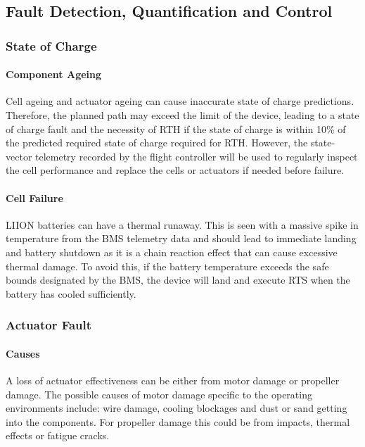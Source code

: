 \subsection{Fault Detection, Quantification and Control}\label{sub_section:tgt_fault_detection}

\subsubsection{State of Charge}\label{sub_sub_section:tgt_SOC}
\paragraph{Component Ageing}
Cell ageing and actuator ageing can cause inaccurate state of charge predictions. Therefore, the planned path may exceed the limit of the device, leading to a state of charge fault and the necessity of \gls{RTH} if the state of charge is within 10\% of the predicted required state of charge required for \gls{RTH}. However, the state-vector telemetry recorded by the flight controller will be used to regularly inspect the cell performance and replace the cells or actuators if needed before failure.
\paragraph{Cell Failure}
\gls{LIION} batteries can have a thermal runaway. This is seen with a massive spike in temperature from the \gls{BMS} telemetry data and should lead to immediate landing and battery shutdown as it is a chain reaction effect that can cause excessive thermal damage\cite{LiONRunaway}. To avoid this, if the battery temperature exceeds the safe bounds designated by the \gls{BMS}, the device will land and execute \gls{RTS} when the battery has cooled sufficiently.

\subsubsection{Actuator Fault}\label{sub_sub_section:tgt_actuator_fault}
\paragraph{Causes}
A loss of actuator effectiveness can be either from motor damage or propeller damage. The possible causes of motor damage specific to the operating environments include: wire damage, cooling blockages and dust or sand getting into the components. For propeller damage this could be from impacts, thermal effects or fatigue cracks.
